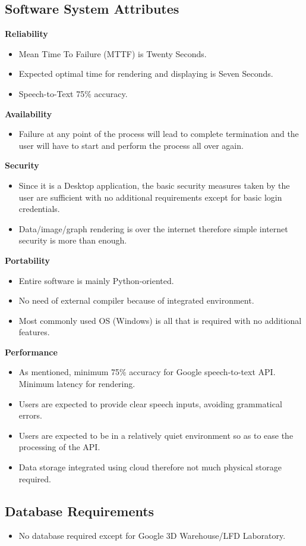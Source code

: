 \subsection{Software System Attributes}
\textbf{Reliability}
\begin{itemize}
  \item Mean Time To Failure (MTTF) is Twenty Seconds.
  \item Expected optimal time for rendering and displaying is Seven Seconds.
  \item Speech-to-Text 75\% accuracy.
\end{itemize}

\textbf{Availability}
\begin{itemize}
  \item Failure at any point of the process will lead to complete termination and the user will have to start and perform the process all over again.
\end{itemize}

\textbf{Security}
\begin{itemize}
  \item Since it is a Desktop application, the basic security measures taken by the user are sufficient with no additional requirements except for basic login credentials.
  \item Data/image/graph rendering is over the internet therefore simple internet security is more than enough.
\end{itemize}

\textbf{Portability}
\begin{itemize}
  \item Entire software is mainly Python-oriented.
  \item No need of external compiler because of integrated environment.
  \item Most commonly used OS (Windows) is all that is required with no additional features.
\end{itemize}

\textbf{Performance}
\begin{itemize}
  \item As mentioned, minimum 75\% accuracy for Google speech-to-text API. Minimum latency for rendering.
  \item Users are expected to provide clear speech inputs, avoiding grammatical errors.
  \item Users are expected to be in a relatively quiet environment so as to ease the processing of the API.
  \item Data storage integrated using cloud therefore not much physical storage required.
\end{itemize}

\subsection{Database Requirements}
\begin{itemize}
\item No database required except for Google 3D Warehouse/LFD Laboratory.
\end{itemize}